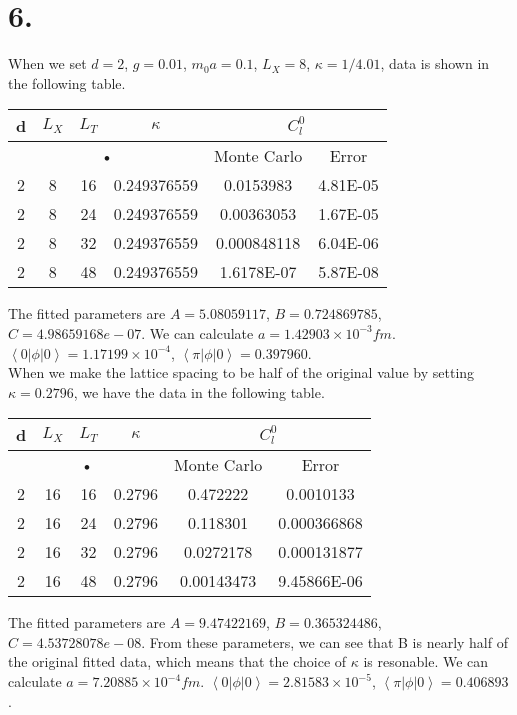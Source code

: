 \documentclass[12pt]{article}
\begin{document}
\section*{6.}
When we set $d = 2$, $g = 0.01$, $m_0a = 0.1$, $L_X = 8$, $\kappa = 1/4.01$, data is shown in the following table. \\
\begin{center}
\begin{tabular}{|c|c|c|c|c|c|}
\hline 
d & $L_X$ & $L_T$ & $\kappa$ & \multicolumn{2}{c|}{$C_l^0$} \\ 
\hline 
\multicolumn{4}{|c|}{•} & Monte Carlo & Error\\ 
\hline 
2 & 8 & 16 & 0.249376559 & 0.0153983 & 4.81E-05\\ 
\hline 
2 & 8 & 24 & 0.249376559 & 0.00363053 & 1.67E-05\\ 
\hline 
2 & 8 & 32 & 0.249376559 & 0.000848118 & 6.04E-06\\ 
\hline 
2 & 8 & 48 & 0.249376559 & 1.6178E-07 & 5.87E-08\\ 
\hline 
\end{tabular} 
\end{center}
The fitted parameters are $A = 5.08059117$, $B = 0.724869785$, $C = 4.98659168e-07$. We can calculate $a = 1.42903\times10^{-3} fm$. $\left<0|\phi|0\right> = 1.17199\times10^{-4}$, $\left<\pi|\phi|0\right> = 0.397960$. \\
When we make the lattice spacing to be half of the original value by setting $\kappa = 0.2796$, we have the data in the following table. \\
\begin{center}
\begin{tabular}{|c|c|c|c|c|c|}
\hline 
d & $L_X$ & $L_T$ & $\kappa$ & \multicolumn{2}{c|}{$C_l^0$} \\ 
\hline 
\multicolumn{4}{|c|}{•} & Monte Carlo & Error\\ 
\hline 
2 & 16 & 16 & 0.2796 & 0.472222 & 0.0010133\\ 
\hline 
2 & 16 & 24 & 0.2796 & 0.118301 & 0.000366868\\ 
\hline 
2 & 16 & 32 & 0.2796 & 0.0272178 & 0.000131877\\ 
\hline 
2 & 16 & 48 & 0.2796 & 0.00143473 & 9.45866E-06\\ 
\hline 
\end{tabular} 
\end{center}
The fitted parameters are $A = 9.47422169$, $B = 0.365324486$, $C = 4.53728078e-08$. From these parameters, we can see that B is nearly half of the original fitted data, which means that the choice of $\kappa$ is resonable. We can calculate $a = 7.20885\times10^{-4} fm$. $\left<0|\phi|0\right> = 2.81583\times10^{-5}$, $\left<\pi|\phi|0\right> = 0.406893$. \\
\end{document}
